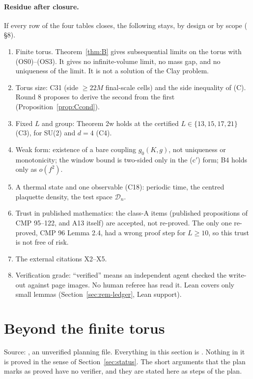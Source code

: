 \paragraph{Residue after closure.} If every row of the four tables closes, the following stays, by design or by scope ( \S8).
\begin{enumerate}
\item Finite torus. Theorem~\ref{thm:B} gives subsequential limits on the torus with (OS0)--(OS3). It gives no infinite-volume limit, no mass gap, and no uniqueness of the limit. It is not a solution of the Clay problem.
\item Torus size: C31 (side $\ge22M$ final-scale cells) and the side inequality of (C). Round 8 proposes to derive the second from the first (Proposition~\ref{prop:Ccond}).
\item Fixed $L$ and group: Theorem 2w holds at the certified $L\in\{13,15,17,21\}$ (C3), for SU(2) and $d=4$ (C4).
\item Weak form: existence of a bare coupling $g_0(K,g)$, not uniqueness or monotonicity; the window bound is two-sided only in the (c$'$) form; B4 holds only as $o(f^2)$.
\item A thermal state and one observable (C18): periodic time, the centred plaquette density, the test space $\mathcal D_n$.
\item Trust in published mathematics: the class-A items (published propositions of CMP 95--122, and A13 itself) are accepted, not re-proved. The only one re-proved, CMP 96 Lemma 2.4, had a wrong proof step for $L\ge10$, so this trust is not free of risk.
\item The external citations X2--X5.
\item Verification grade: ``verified'' means an independent agent checked the write-out against page images. No human referee has read it. Lean covers only small lemmas (Section~\ref{sec:rem-ledger}, Lean support).
\end{enumerate}

\section{Beyond the finite torus}\label{sec:beyond}

Source: , an unverified planning file. Everything in this section is . Nothing in it is proved in the sense of Section~\ref{sec:status}. The short arguments that the plan marks as proved have no verifier, and they are stated here as steps of the plan.

